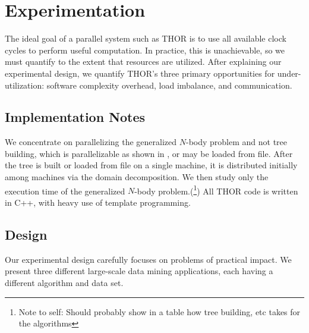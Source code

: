 \documentclass[twoside,leqno,twocolumn]{article}
\newcommand{\authornote}[1]{(\footnote{Note to self: #1})}
\newcommand{\authorsnote}[1]{\authornote{#1}}
\begin{document}



\section{Experimentation}


The ideal goal of a parallel system such as THOR is to use all available clock cycles to perform useful computation.
In practice, this is unachievable, so we must quantify to the extent that resources are utilized.
After explaining our experimental design, we quantify THOR's three primary opportunities for under-utilization: software complexity overhead, load imbalance, and communication.

\subsection{Implementation Notes}

We concentrate on parallelizing the generalized $N$-body problem and not tree building, which is parallelizable as shown in \cite{alfuraih00parallel}, or may be loaded from file.
After the tree is built or loaded from file on a single machine, it is distributed initially among machines via the domain decomposition.
We then study only the execution time of the generalized $N$-body problem.\authorsnote{Should probably show in a table how tree building, etc takes for the algorithms}
All THOR code is written in C++, with heavy use of template programming.

\subsection{Design}


Our experimental design carefully focuses on problems of practical impact.
We present three different large-scale data mining applications, each having a different algorithm and data set.
\end{document}

